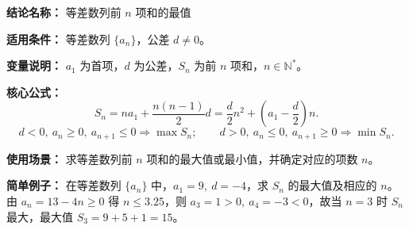 \textbf{结论名称：} 等差数列前 \(n\) 项和的最值

\textbf{适用条件：} 等差数列 \(\{a_n\}\)，公差 \(d \neq 0\)。

\textbf{变量说明：} \(a_1\) 为首项，\(d\) 为公差，\(S_n\) 为前 \(n\) 项和，\(n\in\mathbb{N}^*\)。

\textbf{核心公式：}
\[
S_n = na_1 + \frac{n(n-1)}{2}d = \frac{d}{2}n^2 + \left(a_1 - \frac{d}{2}\right)n.
\]
\[
\boxed{ d<0,\ a_n \ge 0,\ a_{n+1} \le 0 \Rightarrow \max S_n;\qquad d>0,\ a_n \le 0,\ a_{n+1} \ge 0 \Rightarrow \min S_n. }
\]

\textbf{使用场景：} 求等差数列前 \(n\) 项和的最大值或最小值，并确定对应的项数 \(n\)。

\textbf{简单例子：} 在等差数列 \(\{a_n\}\) 中，\(a_1 = 9,\ d = -4\)，求 \(S_n\) 的最大值及相应的 \(n\)。
由 \(a_n = 13-4n \ge 0\) 得 \(n \le 3.25\)，则 \(a_3=1>0,\ a_4=-3<0\)，故当 \(n=3\) 时 \(S_n\) 最大，最大值 \(S_3 = 9+5+1 = 15\)。